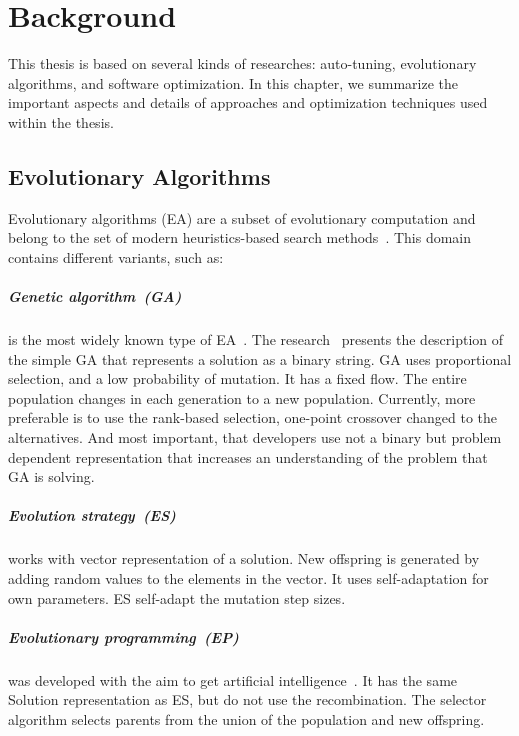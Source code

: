 \chapter{Background}
\label{chapter:background}
This thesis is based on several kinds of researches: auto-tuning, evolutionary algorithms, and software optimization. In this chapter, we summarize the important aspects and details of approaches and optimization techniques used within the thesis.  

\section{Evolutionary Algorithms}
\label{sec:GeneticAlgorithm}

Evolutionary algorithms (EA) are a subset of evolutionary computation and belong to the set of modern heuristics-based search methods~\cite{vikhar16}.
This domain contains different variants, such as:
\paragraph{Genetic algorithm~(GA)} is the most widely known type of EA~\cite{eiben03}. The research~\cite{deJong75} presents the description of the simple GA that represents a solution as a binary string. GA uses proportional selection, and a low probability of mutation. It has a fixed flow. The entire population changes in each generation to a new population. Currently, more preferable is to use the rank-based selection, one-point crossover changed to the alternatives. And most important, that developers use not a binary but problem dependent representation that increases an understanding of the problem that GA is solving.
\paragraph{Evolution strategy~(ES)} works with vector representation of a solution. New offspring is generated by adding random values to the elements in the vector. It uses self-adaptation for own parameters. ES self-adapt the mutation step sizes.
\paragraph{Evolutionary programming~(EP)} was developed with the aim to get artificial intelligence~\cite{eiben03}. It has the same Solution representation as ES, but do not use the recombination. The selector algorithm selects parents from the union of the population and new offspring.
